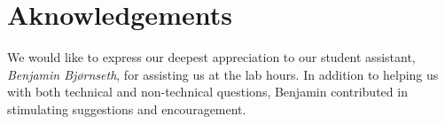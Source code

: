\section{Aknowledgements}
We would like to express our deepest appreciation to our student assistant, \emph{Benjamin Bjørnseth}, for assisting us at the lab hours. In addition to helping us with both technical and non-technical questions, Benjamin contributed in stimulating suggestions and encouragement.
